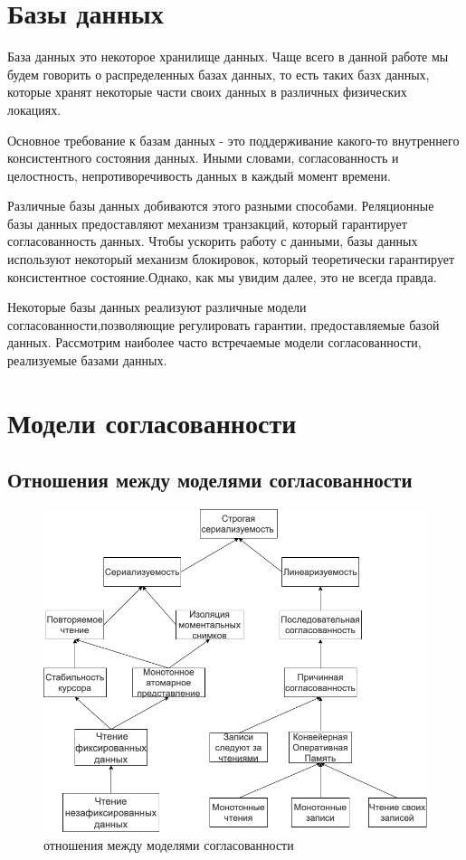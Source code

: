 \documentclass[12pt,  openany]{book}
\begin{document}
\section{Базы данных}
База данных это некоторое хранилище данных.  Чаще всего в данной работе мы будем говорить о распределенных базах данных, то есть таких базх данных,  которые хранят некоторые части своих данных в различных физических локациях.
\par
Основное требование к базам данных - это поддерживание какого-то внутреннего консистентного состояния данных. Иными словами, согласованность и целостность, непротиворечивость данных в каждый момент времени.
\par
Различные базы данных добиваются этого разными способами. Реляционные базы данных предоставляют механизм транзакций, который гарантирует согласованность данных. Чтобы ускорить работу с данными, базы данных используют некоторый механизм блокировок, который теоретически гарантирует консистентное состояние.Однако, как мы увидим далее, это не всегда правда.
\par
Некоторые базы данных реализуют различные модели согласованности,позволяющие регулировать гарантии, предоставляемые базой данных. Рассмотрим наиболее часто встречаемые модели согласованности, реализуемые базами данных.
\section{Модели согласованности \cite{jepsenConsistencyModels}}
\subsection{Отношения между моделями согласованности}
\begin{figure}[H]
  \includegraphics[width=\textwidth]{model-consistency.png}
  \caption{отношения между моделями согласованности}
\end{figure}
\end{document}
